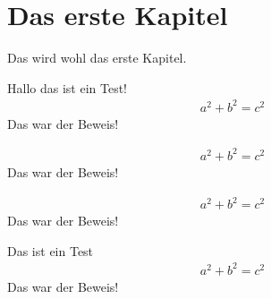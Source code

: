 \chapter{Das erste Kapitel}
Das wird wohl das erste Kapitel.

\begin{defs}[Pythagoras]
	Hallo das ist ein Test!
\begin{align}
a^2+b^2=c^2
\end{align}
Das war der Beweis!
\end{defs}
\begin{defs}[Pythagoras]
	\begin{align}
	a^2+b^2=c^2
	\end{align}
	Das war der Beweis!
\end{defs}
\begin{satz}
\blindtext
	\begin{bew}
	\blindtext
	\end{bew}
\end{satz}

\begin{lem}[Pythagoras]
	\begin{align}
	a^2+b^2=c^2
	\end{align}
	Das war der Beweis!
\end{lem}
\begin{kor}[Pythagoras]
Das ist ein Test
	\begin{align}
	a^2+b^2=c^2
	\end{align}
	Das war der Beweis!
\end{kor}
\begin{bsp}
\blindtext
\end{bsp}
\begin{satz}
	\blindtext
\end{satz}